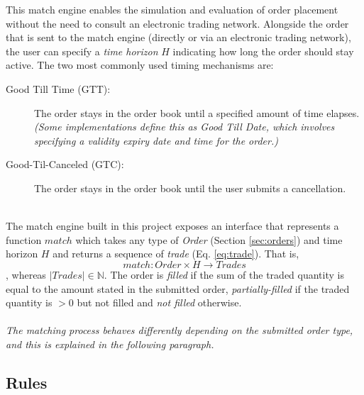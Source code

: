 This match engine enables the simulation and evaluation of order placement without the need to consult an electronic trading network.
Alongside the order that is sent to the match engine (directly or via an electronic trading network), the user can specify a \textit{time horizon} $H$ indicating how long the order should stay active.
The two most commonly used timing mechanisms are:
\begin{description}
    \item[Good Till Time (GTT): ] The order stays in the order book until a specified amount of time elapses. \textit{(Some implementations define this as Good Till Date, which involves specifying a validity expiry date and time for the order.)}
    \item[Good-Til-Canceled (GTC): ] The order stays in the order book until the user submits a cancellation.
\end{description}
\hfill
\\
The match engine built in this project exposes an interface that represents a function $match$ which takes any type of \textit{Order} (Section \ref{sec:orders}) and time horizon $H$ and returns a sequence of \textit{trade} (Eq. \ref{eq:trade}).
That is,
\begin{equation}
    match : Order \times H \rightarrow Trades
\end{equation}
, whereas $|Trades| \in \mathbb{N}$.
The order is \textit{filled} if the sum of the traded quantity is equal to the amount stated in the submitted order, \textit{partially-filled} if the traded quantity is $> 0$ but not filled and \textit{not filled} otherwise.
\\
\\
\textit{The matching process behaves differently depending on the submitted order type, and this is explained in the following paragraph.}

\subsection{Rules}

